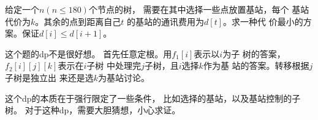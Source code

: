 \begin{prob}
	给定一个$n(n\le 180)$个节点的树，
	需要在其中选择一些点放置基站，每个
	基站代价为$k$。其余的点到距离自己$t$
	的基站的通讯费用为$d[t]$。求一种代
	价最小的方案。保证$d[i] \le d[i+1]$。
\end{prob}

\begin{sol}
	这个题的dp不是很好想。
	首先任意定根。用$f_1[i]$表示以$i$为子
	树的答案，$f_2[i][j][k]$表示在$i$子树
	中处理完$j$子树，且$i$选择$k$作为基
	站的答案。转移根据$j$子树是独立出
	来还是选$k$为基站讨论。\par
	这个dp的本质在于强行限定了一些条件，
	比如选择的基站，以及基站控制的子树。
	对于这种dp，需要大胆猜想，小心求证。
\end{sol}
